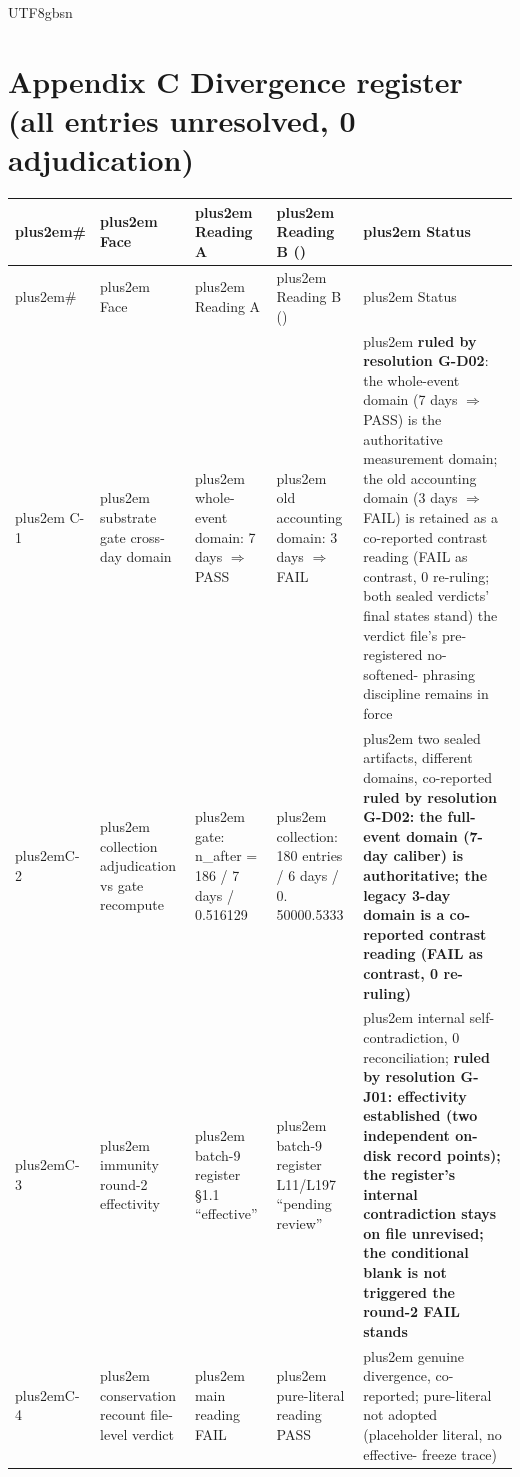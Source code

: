 \documentclass[11pt,letterpaper]{article}
\newcommand{\RaggedRight}{\rightskip=0pt plus2em\relax}
\begin{document}
\begin{CJK}{UTF8}{gbsn}
\section*{Appendix C \textemdash{} Divergence register (all entries unresolved, 0 adjudication)}

{\footnotesize\begin{longtable}{>{\RaggedRight\arraybackslash}p{1.54cm} >{\RaggedRight\arraybackslash}p{3.04cm} >{\RaggedRight\arraybackslash}p{3.04cm} >{\RaggedRight\arraybackslash}p{3.04cm} >{\RaggedRight\arraybackslash}p{3.04cm}}
\toprule
\# & Face & Reading A & Reading B (\textellipsis{}) & Status \\
\midrule
\endfirsthead
\toprule
\# & Face & Reading A & Reading B (\textellipsis{}) & Status \\
\midrule
\endhead
\endfoot
\bottomrule
\endlastfoot
C-1 & substrate gate cross-day domain & whole-event domain: 7 days \ensuremath{\Rightarrow} PASS & old accounting domain: 3 days \ensuremath{\Rightarrow} FAIL & \textbf{ruled by resolution G-D02}: the whole-event domain (7 days \ensuremath{\Rightarrow} PASS) is the authoritative measurement domain; the old accounting domain (3 days \ensuremath{\Rightarrow} FAIL) is retained as a co-reported contrast reading (FAIL as contrast, 0 re-ruling; both sealed verdicts' final states stand) \textemdash{} the verdict file's pre-registered no-\penalty-100 softened-\penalty-100 phrasing discipline remains in force \\
C-2 & collection adjudication vs gate recompute & gate: n\_after = 186 / 7 days / 0.516129 & collection: 180 entries / 6 days / 0.\penalty-100 5000\textendash{}0.5333 & two sealed artifacts, different domains, co-reported \textemdash{} \textbf{ruled by resolution G-D02: the full-event domain (7-day caliber) is authoritative; the legacy 3-day domain is a co-reported contrast reading (FAIL as contrast, 0 re-ruling)} \\
C-3 & immunity round-2 effectivity & batch-9 register \S{}1.1 ``effective'' & batch-9 register L11/L197 ``pending review'' & internal self-\penalty-100 contradiction, 0 reconciliation; \textbf{ruled by resolution G-J01: effectivity established (two independent on-disk record points); the register's internal contradiction stays on file unrevised; the conditional blank is not triggered \textemdash{} the round-2 FAIL stands} \\
C-4 & conservation recount file-level verdict & main reading FAIL & pure-literal reading PASS & genuine divergence, co-reported; pure-literal not adopted (placeholder literal, no effective-\penalty-100 freeze trace) \\

\end{longtable}}
\end{CJK}
\end{document}
